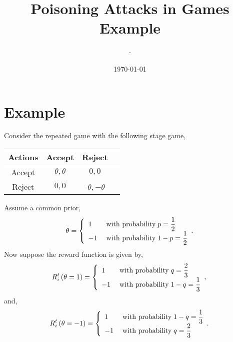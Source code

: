 \documentclass{article}
\title{Poisoning Attacks in Games Example}
\author{-}
\date{\today}
\begin{document}
\newtheorem{thm}{Theorem}
\newtheorem{cor}{Corollary}
\newtheorem{lem}{Lemma}
\newtheorem{prop}{Proposition}
\newtheorem{conj}{Conjecture}
\newtheorem{algo}{Algorithm}
\newtheorem{obs}{Observation}
\newtheorem{clm}{Claim}
\theoremstyle{definition}
\newtheorem{df}{Definition}
\newtheorem{eg}{Example}
\newtheorem{asm}{Assumption}
\newtheorem{cond}{Condition}
\theoremstyle{remark}
\newtheorem{rmk}{Remark}
\maketitle \onehalfspacing \allowdisplaybreaks \raggedbottom


\section{Example} 
Consider the repeated game with the following stage game,
\begin{center} \begin{tabular}{|c|c|c|c|}
\hline
 Actions &Accept &Reject\\ \hline
Accept &$\theta, \theta$ &$0, 0$\\ \hline
Reject &$0, 0$ &-$\theta, -\theta$\\ \hline
\end{tabular} \end{center}
Assume a common prior,
\begin{equation} \theta =\left\{ \begin{array}{ll}
1& \text{\;with probability\;} p = \dfrac{1}{2} \\
-1& \text{\;with probability\;} 1 - p = \dfrac{1}{2} \\
\end{array}.\right. \end{equation}
Now suppose the reward function is given by,
\begin{equation} R_{i}^{t}\left(\theta = 1\right) =\left\{ \begin{array}{ll}
1& \text{\;with probability\;} q = \dfrac{2}{3} \\
-1& \text{\;with probability\;} 1 - q = \dfrac{1}{3} \\
\end{array},\right. \end{equation}
and,
\begin{equation} R_{i}^{t}\left(\theta = -1\right) =\left\{ \begin{array}{ll}
1& \text{\;with probability\;} 1 - q = \dfrac{1}{3} \\
-1& \text{\;with probability\;} q = \dfrac{2}{3} \\
\end{array}.\right. \end{equation}
\end{document}
